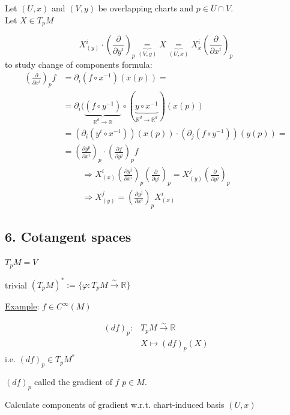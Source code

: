 	Let $(U,x)$ and $(V,y)$ be overlapping charts and $p \in U\cap V$.  \\
	Let $X \in T_pM$
	
	\[
	X^i_{(y)}\cdot \left( \frac{ \partial }{ \partial y^i} \right)_p \underbrace{=}_{(V,y)} X \underbrace{=}_{ (U,x) } X^i_{x} \left( \frac{ \partial }{ \partial x^i} \right)_p
	\]
	to study change of components formula:
	\[
	\begin{aligned}
	\left( \frac{ \partial }{ \partial x^i} \right)_p f & = \partial_i(f\circ x^{-1} )(x(p)) =  \\
	& = \partial_i (\underbrace{ (f\circ y^{-1}) }_{\mathbb{R}^d \to \mathbb{R} } \circ (\underbrace{ y\circ x^{-1}}_{\mathbb{R}^d \to \mathbb{R}^d} )(x(p)) \\
	& = (\partial_i (y^i\circ x^{-1} ) )(x(p)) \cdot (\partial_j (f\circ y^{-1}) )(y(p)) = \\
	& = \boxed{ \left( \frac{ \partial y^p}{ \partial x^i} \right)_p \cdot \left( \frac{ \partial f}{ \partial y^j} \right)_p  } f
	\end{aligned}
	\]
	\[
	\begin{gathered}
	\Longrightarrow X^i_{(x)} \left( \frac{ \partial y^j}{ \partial x^i} \right)_p \left( \frac{ \partial }{ \partial y^j} \right)_p = X^j_{(y)}\left( \frac{ \partial }{ \partial y^j} \right)_p \\
	\Longrightarrow \boxed{ X^j_{(y)} = \left( \frac{ \partial y^j}{ \partial x^i} \right)_pX^i_{(x)} }
	\end{gathered}
	\]
	
	\subsection{6. Cotangent spaces }
	
	$T_pM = V$
	
	trivial $(T_pM)^* := \lbrace \varphi : T_pM \xrightarrow{\sim} \mathbb{R} \rbrace$
	
	\underline{Example}: $f\in C^{\infty}(M)$ 
	
	\[
	\begin{aligned}
	(df)_p : & T_p M \xrightarrow{ \sim } \mathbb{R} \\ 
	& X \mapsto (df)_p(X)
	\end{aligned}
	\]
	i.e. $\boxed{ (df)_p \in T_pM^* } $
	
	$(df)_p$ called the gradient of $f$ \@ $p\in M$.  
	
	Calculate components of gradient w.r.t. chart-induced basis $(U,x)$  
	
